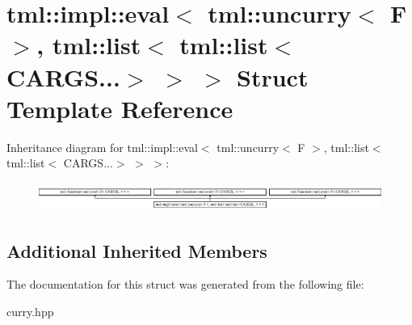 \hypertarget{structtml_1_1impl_1_1eval_3_01tml_1_1uncurry_3_01F_01_4_00_01tml_1_1list_3_01tml_1_1list_3_01CARGS_8_8_8_4_01_4_01_4}{\section{tml\+:\+:impl\+:\+:eval$<$ tml\+:\+:uncurry$<$ F $>$, tml\+:\+:list$<$ tml\+:\+:list$<$ C\+A\+R\+G\+S...$>$ $>$ $>$ Struct Template Reference}
\label{structtml_1_1impl_1_1eval_3_01tml_1_1uncurry_3_01F_01_4_00_01tml_1_1list_3_01tml_1_1list_3_01CARGS_8_8_8_4_01_4_01_4}
}
Inheritance diagram for tml\+:\+:impl\+:\+:eval$<$ tml\+:\+:uncurry$<$ F $>$, tml\+:\+:list$<$ tml\+:\+:list$<$ C\+A\+R\+G\+S...$>$ $>$ $>$\+:\begin{figure}[H]
\begin{center}
\leavevmode
\includegraphics[height=0.947547cm]{structtml_1_1impl_1_1eval_3_01tml_1_1uncurry_3_01F_01_4_00_01tml_1_1list_3_01tml_1_1list_3_01CARGS_8_8_8_4_01_4_01_4}
\end{center}
\end{figure}
\subsection*{Additional Inherited Members}


The documentation for this struct was generated from the following file\+:\begin{DoxyCompactItemize}
\item 
curry.\+hpp\end{DoxyCompactItemize}
